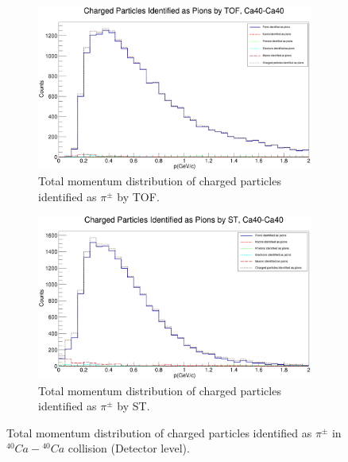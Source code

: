 \documentclass[12pt, twocolumn]{article}
\begin{document}
\begin{figure}[h]
\centering
\begin{subfigure}[h]{0.49\textwidth}
\centering
\includegraphics[scale=0.14]{Detector_pToT_pions(tof)_Ca.png}
\caption{Total momentum distribution of charged particles identified as $\pi^{\pm}$ by TOF.}
\label{Detector - Total momentum distribution of pions (TOF) Ca40.}
\end{subfigure}
\hfill
\begin{subfigure}[h]{0.49\textwidth}
\centering
\includegraphics[scale=0.14]{Detector_pToT_pions(st)_Ca.png}
\caption{Total momentum distribution of charged particles identified as $\pi^{\pm}$ by ST.}
\label{Detector - Total momentum distribution of pions (ST) Ca40.}
\end{subfigure}
\caption{Total momentum distribution of charged particles identified as $\pi^{\pm}$ in $^{40}Ca-{^{40}Ca}$ collision (Detector level).}
\label{Total momentum distribution of charged particles identified as pions in Ca40-Ca40 collision.}
\end{figure}
\end{document}
